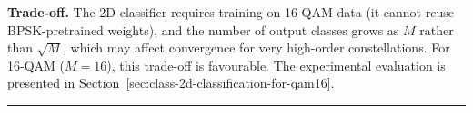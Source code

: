 \textbf{Trade-off.} The 2D classifier requires training on 16-QAM data (it cannot reuse BPSK-pretrained weights), and the number of output classes grows as \(M\) rather than \(\sqrt{M}\), which may affect convergence for very high-order constellations. For 16-QAM (\(M = 16\)), this trade-off is favourable. The experimental evaluation is presented in Section~\ref{sec:class-2d-classification-for-qam16}.

\begin{center}\rule{0.5\linewidth}{0.5pt}\end{center}

